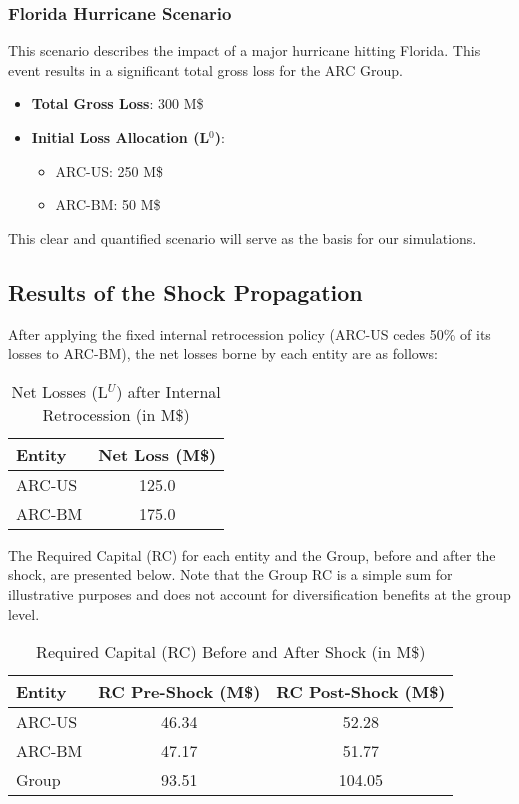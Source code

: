 \subsubsection{Florida Hurricane Scenario}

This scenario describes the impact of a major hurricane hitting Florida. This event results in a significant total gross loss for the ARC Group.

\begin{itemize}
    \item \textbf{Total Gross Loss}: 300 M\$
    \item \textbf{Initial Loss Allocation (L$^0$)}:
    \begin{itemize}
        \item ARC-US: 250 M\$
        \item ARC-BM: 50 M\$
    \end{itemize}
\end{itemize}

This clear and quantified scenario will serve as the basis for our simulations.

\subsection{Results of the Shock Propagation}

After applying the fixed internal retrocession policy (ARC-US cedes 50\% of its losses to ARC-BM), the net losses borne by each entity are as follows:

\begin{table}[h!]
\centering
\caption{Net Losses (L$^U$) after Internal Retrocession (in M\$)}
\label{tab:net_losses}
\begin{tabular}{|l|c|}
\hline
\textbf{Entity} & \textbf{Net Loss (M\$)} \\
\hline
ARC-US & 125.0 \\
ARC-BM & 175.0 \\
\hline
\end{tabular}
\end{table}


The Required Capital (RC) for each entity and the Group, before and after the shock, are presented below. Note that the Group RC is a simple sum for illustrative purposes and does not account for diversification benefits at the group level.

\begin{table}[h!]
\centering
\caption{Required Capital (RC) Before and After Shock (in M\$)}
\label{tab:rc_before_after}
\begin{tabular}{|l|c|c|}
\hline
\textbf{Entity} & \textbf{RC Pre-Shock (M\$)} & \textbf{RC Post-Shock (M\$)} \\
\hline
ARC-US & 46.34 & 52.28 \\
ARC-BM & 47.17 & 51.77 \\
Group & 93.51 & 104.05 \\
\hline
\end{tabular}
\end{table}


